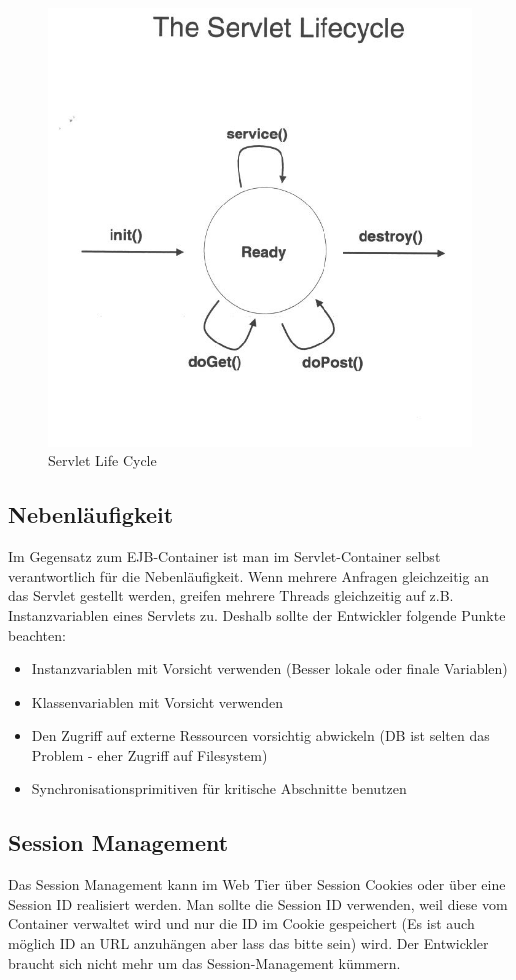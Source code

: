 \begin{figure}
\centering
\includegraphics[width=0.5\linewidth]{fig/servlet-life-cycle}
\caption{Servlet Life Cycle}
\label{fig:servlet-life-cycle}
\end{figure}

\subsection{Nebenläufigkeit}

Im Gegensatz zum EJB-Container ist man im Servlet-Container selbst verantwortlich für die Nebenläufigkeit. Wenn mehrere Anfragen gleichzeitig an das Servlet gestellt werden, greifen mehrere Threads gleichzeitig auf z.B. Instanzvariablen eines Servlets zu. Deshalb sollte der Entwickler folgende Punkte beachten:

\begin{itemize}
	\item Instanzvariablen mit Vorsicht verwenden (Besser lokale oder finale Variablen)
	\item Klassenvariablen mit Vorsicht verwenden
	\item Den Zugriff auf externe Ressourcen vorsichtig abwickeln (DB ist selten das Problem - eher Zugriff auf Filesystem)
	\item Synchronisationsprimitiven für kritische Abschnitte benutzen
\end{itemize}

\subsection{Session Management}

Das Session Management kann im Web Tier über Session Cookies oder über eine Session ID realisiert werden. Man sollte die Session ID verwenden, weil diese vom Container verwaltet wird und nur die ID im Cookie gespeichert (Es ist auch möglich ID an URL anzuhängen aber lass das bitte sein) wird. Der Entwickler braucht sich nicht mehr um das Session-Management kümmern.

